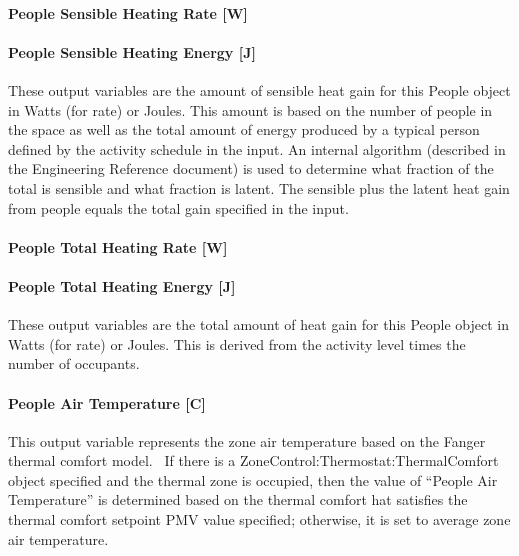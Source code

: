 \paragraph{People Sensible Heating Rate {[}W{]}}\label{people-sensible-heating-rate-w}

\paragraph{People Sensible Heating Energy {[}J{]}}\label{people-sensible-heating-energy-j}

These output variables are the amount of sensible heat gain for this People object in Watts (for rate) or Joules. This amount is based on the number of people in the space as well as the total amount of energy produced by a typical person defined by the activity schedule in the input. An internal algorithm (described in the Engineering Reference document) is used to determine what fraction of the total is sensible and what fraction is latent. The sensible plus the latent heat gain from people equals the total gain specified in the input.

\paragraph{People Total Heating Rate {[}W{]}}\label{people-total-heating-rate-w}

\paragraph{People Total Heating Energy {[}J{]}}\label{people-total-heating-energy-j}

These output variables are the total amount of heat gain for this People object in Watts (for rate) or Joules. This is derived from the activity level times the number of occupants.

\paragraph{People Air Temperature {[}C{]}}\label{people-air-temperature-c}

This output variable represents the zone air temperature based on the Fanger thermal comfort model.~ If there is a ZoneControl:Thermostat:ThermalComfort object specified and the thermal zone is occupied, then the value of ``People Air Temperature'' is determined based on the thermal comfort hat satisfies the thermal comfort setpoint PMV value specified; otherwise, it is set to average zone air temperature.

